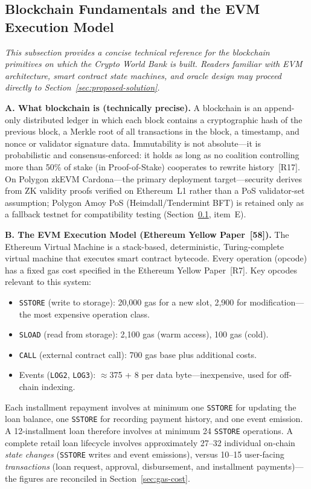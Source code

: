 \documentclass[12pt,a4paper]{report}
\begin{document}
\subsection{Blockchain Fundamentals and the EVM Execution Model}
\label{sec:blockchain-fundamentals}

\noindent\textit{\small This subsection provides a concise technical reference for the blockchain primitives on which the Crypto World Bank is built. Readers familiar with EVM architecture, smart contract state machines, and oracle design may proceed directly to Section~\ref{sec:proposed-solution}.}

\vspace{4pt}
\textbf{A. What blockchain is (technically precise).}
A blockchain is an append-only distributed ledger in which each block contains a cryptographic hash of the previous block, a Merkle root of all transactions in the block, a timestamp, and nonce or validator signature data. Immutability is not absolute---it is probabilistic and consensus-enforced: it holds as long as no coalition controlling more than 50\% of stake (in Proof-of-Stake) cooperates to rewrite history~[R17]. On Polygon zkEVM Cardona---the primary deployment target---security derives from ZK validity proofs verified on Ethereum~L1 rather than a PoS validator-set assumption; Polygon Amoy PoS (Heimdall/Tendermint BFT) is retained only as a fallback testnet for compatibility testing (Section~\ref{sec:blockchain-fundamentals}, item~E).

\textbf{B. The EVM Execution Model (Ethereum Yellow Paper~[58]).}
The Ethereum Virtual Machine is a stack-based, deterministic, Turing-complete virtual machine that executes smart contract bytecode. Every operation (opcode) has a fixed gas cost specified in the Ethereum Yellow Paper~[R7]. Key opcodes relevant to this system:
\begin{itemize}[noitemsep]
  \item \texttt{SSTORE} (write to storage): 20,000 gas for a new slot, 2,900 for modification---the most expensive operation class.
  \item \texttt{SLOAD} (read from storage): 2,100 gas (warm access), 100 gas (cold).
  \item \texttt{CALL} (external contract call): 700 gas base plus additional costs.
  \item Events (\texttt{LOG2}, \texttt{LOG3}): $\approx$375 + 8 per data byte---inexpensive, used for off-chain indexing.
\end{itemize}
Each installment repayment involves at minimum one \texttt{SSTORE} for updating the loan balance, one \texttt{SSTORE} for recording payment history, and one event emission. A 12-installment loan therefore involves at minimum 24 \texttt{SSTORE} operations. A complete retail loan lifecycle involves approximately 27--32 individual on-chain \textit{state changes} (\texttt{SSTORE} writes and event emissions), versus 10--15 user-facing \textit{transactions} (loan request, approval, disbursement, and installment payments)---the figures are reconciled in Section~\ref{sec:gas-cost}.
\end{document}
